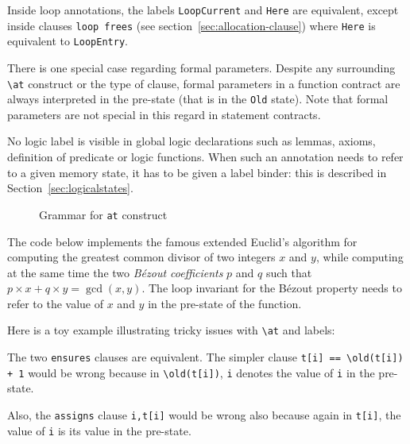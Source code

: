 Inside loop annotations, the labels \lstinline|LoopCurrent| and 
\lstinline|Here| are equivalent,
except inside clauses \lstinline|loop frees|
(see section~\ref{sec:allocation-clause}) 
where \lstinline|Here| is equivalent to \lstinline|LoopEntry|.

There is one special case regarding formal parameters.
Despite any surrounding \lstinline|\at| construct or the 
type of clause, formal
parameters in a function contract are always interpreted
in the pre-state (that is in the \lstinline|Old| state).
Note that formal parameters are not special in this regard in 
statement contracts.

No logic label is visible in global logic declarations
such as lemmas, axioms, definition of predicate or logic
functions. When such an annotation needs to refer to a given memory
state, it has to be given a label binder: this is described in
Section~\ref{sec:logicalstates}.

\begin{figure}[t]
  \begin{cadre}
    
  \end{cadre}
  \caption{Grammar for \lstinline|at| construct}
  \label{fig:gram:at}
\end{figure}


\begin{example}
  The code below implements the famous extended Euclid's algorithm
  for computing the greatest common divisor of two integers $x$ and
  $y$, while computing at the same time the two \emph{B\'ezout coefficients} $p$
  and $q$ such that $p\times x+q\times y = \gcd(x,y)$.
  The loop invariant for the B\'ezout property needs to refer to the
  value of $x$ and $y$ in the pre-state of the function.
\end{example}

\begin{example}
  Here is a toy example illustrating tricky issues with \lstinline|\at| and
  labels:


  The two \lstinline|ensures| clauses are equivalent. The simpler clause
  \lstinline|t[i] == \old(t[i]) + 1| would be wrong because in
  \lstinline|\old(t[i])|, \lstinline|i| denotes the value of \texttt{i} in the
  pre-state.

  Also, the \lstinline|assigns| clause \lstinline|i,t[i]| would be
  wrong also because again in \lstinline|t[i]|, the value of \texttt{i} is
  its value in the pre-state.

\end{example}

